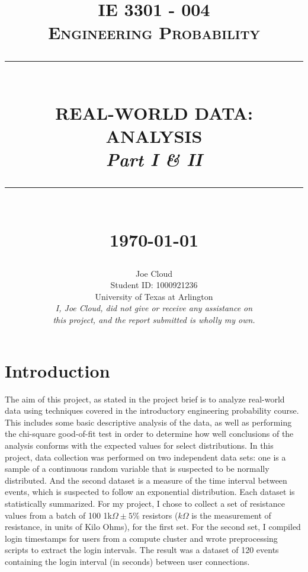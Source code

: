 \documentclass[10pt]{report}
\newcommand{\HRule}[1]{\rule{\linewidth}{#1}}
\begin{document}
\title{ \normalsize \textsc{IE 3301 - 004 \\ Engineering Probability}
		\\ [2.0cm]
		\HRule{0.5pt} \\
		\LARGE \textbf{\uppercase{Real-World Data: Analysis}} \\
		\normalsize \textit{Part I \& II}
		\HRule{2pt} \\ [0.5cm]
		\normalsize \today \vspace*{5\baselineskip}}

\date{}

\author{
	Joe Cloud \\
		Student ID: 1000921236 \\
		University of Texas at Arlington \\[1in]
		\textit{I, Joe Cloud, did not give or receive any assistance on }\\
		\textit{this project, and the report submitted is wholly my own.}}



	\maketitle
\tableofcontents
\newpage

\sectionfont{\scshape}

\section*{Introduction}

The aim of this project, as stated in the project brief is to analyze real-world
data using techniques covered in the introductory engineering probability course.
This includes some basic descriptive analysis of the data, as well as performing the 
chi-square good-of-fit test in order to determine how well conclusions of the analysis conforms
with the expected values for select distributions.
In this project, data collection was performed on two independent 
data sets: one is a sample of a continuous random variable that is suspected to be 
normally distributed. And the second dataset is a measure of the time interval between events, 
which is suspected to follow an exponential distribution. 
Each dataset is statistically summarized.  
For my project, I chose to collect a set of resistance values from a batch of 100 
1k$\Omega \pm 5\%$ resistors ($k\Omega$ is the measurement of resistance, in units of Kilo Ohms), 
for the first set. For the second set, I compiled login timestamps for users from a compute cluster and 
wrote preprocessing scripts to extract the login intervals.
The result was a dataset of 120 events containing the login interval (in seconds) between user connections.
\end{document}
